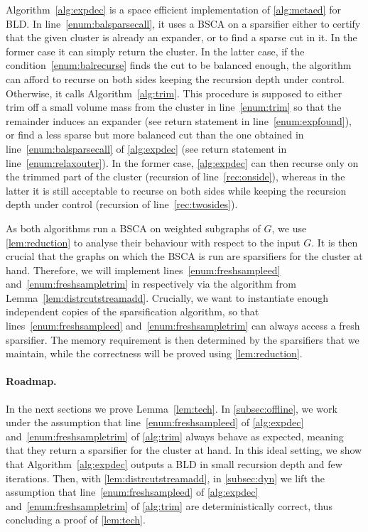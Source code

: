 Algorithm~\ref{alg:expdec} is a space efficient implementation of \cref{alg:metaed} for BLD. In line~\eqref{enum:balsparsecall}, it uses a BSCA on a sparsifier either to certify that the given cluster is already an expander, or to find a sparse cut in it. In the former case it can simply return the cluster. In the latter case, if the condition~\eqref{enum:balrecurse} finds the cut to be balanced enough, the algorithm can afford to recurse on both sides keeping the recursion depth under control. Otherwise, it calls Algorithm~\ref{alg:trim}. This procedure is supposed to either trim off a small volume mass from the cluster in line~\eqref{enum:trim} so that the remainder induces an expander (see return statement in line~\eqref{enum:expfound}), or find a less sparse but more balanced cut than the one obtained in line~\eqref{enum:balsparsecall} of \cref{alg:expdec} (see return statement in line~\eqref{enum:relaxouter}). In the former case, \cref{alg:expdec} can then recurse only on the trimmed part of the cluster (recursion of line~\eqref{rec:onside}), whereas in the latter it is still acceptable to recurse on both sides while keeping the recursion depth under control (recursion of line~\eqref{rec:twosides}).



As both algorithms run a BSCA on weighted subgraphs of $G$, we use \cref{lem:reduction} to analyse their behaviour with respect to the input $G$. It is then crucial that the graphs on which the BSCA is run are sparsifiers for the cluster at hand. Therefore, we will implement lines~\eqref{enum:freshsampleed} and~\eqref{enum:freshsampletrim}  in  respectively via the algorithm from Lemma~\ref{lem:distrcutstreamadd}. Crucially, we want to instantiate enough independent copies of the sparsification algorithm, so that lines~\eqref{enum:freshsampleed} and~\eqref{enum:freshsampletrim} can always access a fresh sparsifier. The memory requirement is then determined by the sparsifiers that we maintain, while the correctness will be proved using \cref{lem:reduction}.

\paragraph{Roadmap.} In the next sections we prove Lemma~\ref{lem:tech}. In \cref{subsec:offline}, we work under the assumption that  line~\eqref{enum:freshsampleed} of \cref{alg:expdec} and~\eqref{enum:freshsampletrim}  of \cref{alg:trim} always behave as expected, meaning that they return a sparsifier for the cluster at hand. In this ideal setting, we show that Algorithm~\ref{alg:expdec} outputs a BLD in small recursion depth and few iterations. Then, with \cref{lem:distrcutstreamadd}, in \cref{subsec:dyn} we lift the assumption that  line~\eqref{enum:freshsampleed} of \cref{alg:expdec} and~\eqref{enum:freshsampletrim}  of \cref{alg:trim} are deterministically correct, thus concluding a proof of \cref{lem:tech}.

